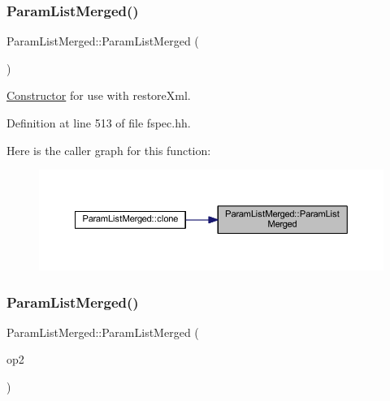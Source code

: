 \subsubsection{\texorpdfstring{ParamListMerged()}{ParamListMerged()}\hspace{0.1cm}{\footnotesize\ttfamily [1/2]}}
{\footnotesize\ttfamily Param\+List\+Merged\+::\+Param\+List\+Merged (\begin{DoxyParamCaption}\item[{void}]{ }\end{DoxyParamCaption})\hspace{0.3cm}{\ttfamily [inline]}}



\mbox{\hyperlink{class_constructor}{Constructor}} for use with restore\+Xml. 



Definition at line 513 of file fspec.\+hh.

Here is the caller graph for this function\+:
\nopagebreak
\begin{figure}[H]
\begin{center}
\leavevmode
\includegraphics[width=350pt]{class_param_list_merged_a5b9e6c47a1d11673ab94fedd7bce15ba_icgraph}
\end{center}
\end{figure}
\mbox{\label{class_param_list_merged_aeaa59d5b53fdbcf3b3f669aef70de20f}} 
\subsubsection{\texorpdfstring{ParamListMerged()}{ParamListMerged()}\hspace{0.1cm}{\footnotesize\ttfamily [2/2]}}
{\footnotesize\ttfamily Param\+List\+Merged\+::\+Param\+List\+Merged (\begin{DoxyParamCaption}\item[{const \mbox{\hyperlink{class_param_list_merged}{Param\+List\+Merged}} \&}]{op2 }\end{DoxyParamCaption})\hspace{0.3cm}{\ttfamily [inline]}}



